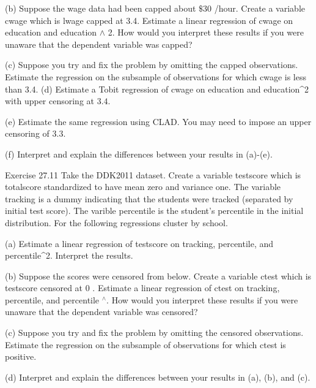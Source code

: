 \documentclass[10pt]{article}
\begin{document}
(b) Suppose the wage data had been capped about $\$ 30$ /hour. Create a variable cwage which is lwage capped at 3.4. Estimate a linear regression of cwage on education and education $\wedge$ 2. How would you interpret these results if you were unaware that the dependent variable was capped?

(c) Suppose you try and fix the problem by omitting the capped observations. Estimate the regression on the subsample of observations for which cwage is less than 3.4. (d) Estimate a Tobit regression of cwage on education and education\^{}2 with upper censoring at $3.4$.

(e) Estimate the same regression using CLAD. You may need to impose an upper censoring of 3.3.

(f) Interpret and explain the differences between your results in (a)-(e).

Exercise 27.11 Take the DDK2011 dataset. Create a variable testscore which is totalscore standardized to have mean zero and variance one. The variable tracking is a dummy indicating that the students were tracked (separated by initial test score). The varible percentile is the student's percentile in the initial distribution. For the following regressions cluster by school.

(a) Estimate a linear regression of testscore on tracking, percentile, and percentile\^{}2. Interpret the results.

(b) Suppose the scores were censored from below. Create a variable ctest which is testscore censored at 0 . Estimate a linear regression of ctest on tracking, percentile, and percentile ${ }^{\wedge}$. How would you interpret these results if you were unaware that the dependent variable was censored?

(c) Suppose you try and fix the problem by omitting the censored observations. Estimate the regression on the subsample of observations for which ctest is positive.

(d) Interpret and explain the differences between your results in (a), (b), and (c).
\end{document}
